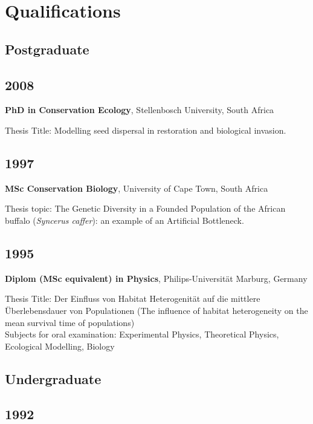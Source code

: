 \documentclass[a4paper]{article}
\begin{document}
\section{Qualifications}

\subsection{Postgraduate}


\subsection{2008}

\textbf{PhD in Conservation Ecology}, Stellenbosch University, South Africa

Thesis Title: Modelling seed dispersal in restoration and biological
invasion.

\subsection{1997}

\textbf{MSc Conservation Biology}, University of Cape Town, South Africa

Thesis topic: The Genetic Diversity in a Founded Population of the
African buffalo (\emph{Syncerus caffer}): an example of an Artificial
Bottleneck.

\subsection{1995}

\textbf{Diplom (MSc equivalent) in Physics}, Philips-Universität Marburg, Germany

Thesis Title: Der Einfluss von Habitat Heterogenität auf die mittlere
Überlebensdauer von Populationen (The influence of habitat heterogeneity
on the mean survival time of populations)\\
Subjects for oral examination: Experimental Physics, Theoretical
Physics, Ecological Modelling, Biology

\subsection{Undergraduate}



\subsection{1992}
\end{document}
